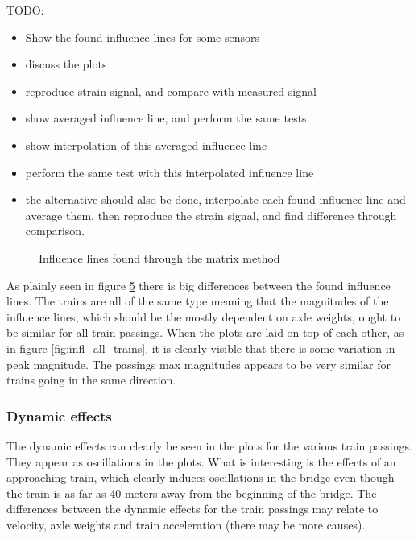TODO:
\begin{itemize}
\item Show the found influence lines for some sensors
\item discuss the plots
\item reproduce strain signal, and compare with measured signal
\item show averaged influence line, and perform the same tests
\item show interpolation of this averaged influence line
\item perform the same test with this interpolated influence line
\item the alternative should also be done, interpolate each found influence line and average them, then reproduce the strain signal, and find difference through comparison.
\end{itemize}


\begin{figure}[H]
\centering
\begin{subfigure}[t]{0.45\textwidth}
	\centering
	
	\label{fig:train3}
\end{subfigure}
\qquad
\begin{subfigure}[t]{0.45\textwidth}
	\centering
	
	\label{fig:train4}
\end{subfigure}

\begin{subfigure}[t]{0.45\textwidth}
	\centering
	
	\label{fig:train5}
\end{subfigure}
\qquad
\begin{subfigure}[t]{0.45\textwidth}
	\centering
	
	\label{fig:train8}
\end{subfigure}
\caption{Influence lines found through the matrix method}\label{fig:infl_trains}
\label{fig:4Influence_lines}
\end{figure}
As plainly seen in figure \ref{fig:4Influence_lines} there is big differences between the found influence lines. The trains are all of the same type meaning that the magnitudes of the influence lines, which should be the mostly dependent on axle weights, ought to be similar for all train passings.  When the plots are laid on top of each other, as in figure \ref{fig:infl_all_trains}, it is clearly visible that there is some variation in peak magnitude. The passings max magnitudes appears to be very similar for trains going in the same direction.
\subsubsection{Dynamic effects}
The dynamic effects can clearly be seen in the plots for the various train passings. They appear as oscillations in the plots.
What is interesting is the effects of an approaching train, which clearly induces oscillations in the bridge even though the train is as far as 40 meters away from the beginning of the bridge. The differences between the dynamic effects for the train passings may relate to velocity, axle weights and train acceleration (there may be more causes).


